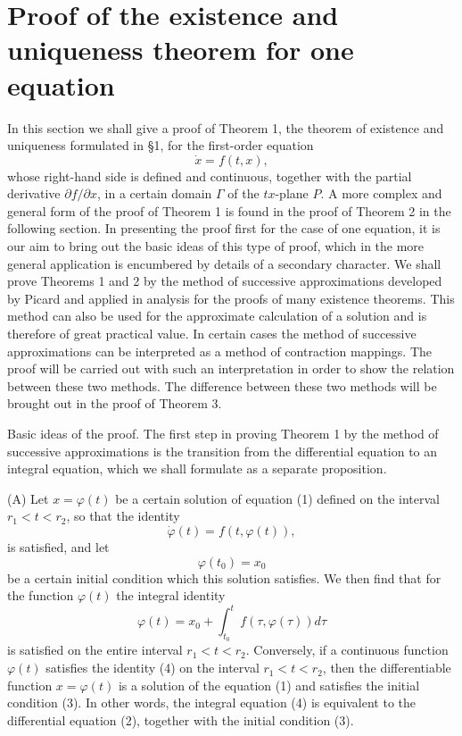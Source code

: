 \documentclass[10pt,a5paper]{book}
\theoremstyle{plain}
\theoremstyle{definition}
\theoremstyle{remark}
\begin{document}
\section{Proof of the existence and uniqueness theorem for one equation}
In this section we shall give a proof of Theorem 1, the theorem of existence and uniqueness formulated in §1, for the first-order equation
\begin{equation*}
\dot{x}=f(t, x), \tag{1}
\end{equation*}
whose right-hand side is defined and continuous, together with the partial derivative $\partial f / \partial x$, in a certain domain $\Gamma$ of the $t x$-plane $P$. A more complex and general form of the proof of Theorem 1 is found in the proof of Theorem 2 in the following section. In presenting the proof first for the case of one equation, it is our aim to bring out the basic ideas of this type of proof,
which in the more general application is encumbered by details of a secondary character. We shall prove Theorems 1 and 2 by the method of successive approximations developed by Picard and applied in analysis for the proofs of many existence theorems. This method can also be used for the approximate calculation of a solution and is therefore of great practical value. In certain cases the method of successive approximations can be interpreted as a method of contraction mappings. The proof will be carried out with such an interpretation in order to show the relation between these two methods. The difference between these two methods will be brought out in the proof of Theorem 3.

Basic ideas of the proof. The first step in proving Theorem 1 by the method of successive approximations is the transition from the differential equation to an integral equation, which we shall formulate as a separate proposition.

(A) Let $x=\varphi(t)$ be a certain solution of equation (1) defined on the interval $r_{1}<t<r_{2}$, so that the identity
\begin{equation*}
\dot{\varphi}(t)=f(t, \varphi(t)), \tag{2}
\end{equation*}
is satisfied, and let
\begin{equation*}
\varphi\left(t_{0}\right)=x_{0} \tag{3}
\end{equation*}
be a certain initial condition which this solution satisfies. We then find that for the function $\varphi(t)$ the integral identity
\begin{equation*}
\varphi(t)=x_{0}+\int_{t_{0}}^{t} f(\tau, \varphi(\tau)) d \tau \tag{4}
\end{equation*}
is satisfied on the entire interval $r_{1}<t<r_{2}$. Conversely, if a continuous function $\varphi(t)$ satisfies the identity (4) on the interval $r_{1}<t<r_{2}$, then the differentiable function $x=\varphi(t)$ is a solution of the equation (1) and satisfies the initial condition (3). In other words, the integral equation (4) is equivalent to the differential equation (2), together with the initial condition (3).
\end{document}
